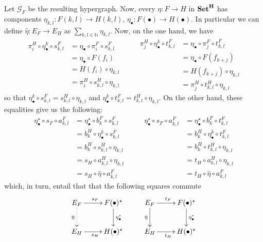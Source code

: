 \documentclass[runningheads,envcountsect]{llncs}
\newcommand{\catname}[1]{\textbf{\textup{#1}}}
\begin{document}
Let $\mathcal{G}_F$ be the resulting hypergraph. Now, every $\eta\colon F\rightarrow H$ in $\catname{Set}^{\catname{H}}$ has components $\eta_{k,l}\colon F(k,l)\to H(k,l)$, $\eta_{\bullet}\colon F(\bullet)\to H(\bullet)$. In particular we can define $\hat{\eta}\colon E_F\rightarrow E_H$ as $\sum_{k,l\in \mathbb{N}}\eta_{k,l}$. Now, on the one hand, we have
\[\begin{split}
	\pi^H_i\circ \eta^k_\bullet \circ  s^F_{k,l}&=\eta_\bullet \circ \pi^F_i \circ s^F_{k,l}\\&=\eta_\bullet \circ F(f_i)\\&=H(f_i)\circ \eta_{k,l}\\&=\pi^H_i\circ s^{H}_{k,l}\circ \eta_{k,l}
\end{split} \qquad \begin{split}
\pi^H_j\circ \eta^k_\bullet \circ  t^F_{k,l}&=\eta_\bullet \circ \pi^F_j \circ t^F_{k,l}\\&=\eta_\bullet \circ F(f_{k+j})\\&=H(f_{k+j})\circ \eta_{k,l}\\&=\pi^H_j\circ t^{H}_{k,l}\circ \eta_{k,l}
\end{split} \]
so that $\eta^k_\bullet \circ  s^F_{k,l}=s^{H}_{k,l}\circ \eta_{k,l}$ and $\eta^k_\bullet \circ  t^F_{k,l}= t^{H}_{k,l}\circ \eta_{k,l}$. On the other hand, these equalities give us the following:
\[\begin{split}
	\eta_{\bullet}^\star \circ s_{F}\circ a^F_{k,l}&=\eta_{\bullet}^\star \circ b^F_k\circ s^F_{k,l}\\&=b^H_k\circ \eta^k_{\bullet}\circ s^{F}_{k,l} \\&=b^H_{k}\circ s^H_{k,l}\circ \eta_{k,l}\\&=s_H\circ a^H_{k,l}\circ \eta_{k,l}\\&=	s_H\circ \hat{\eta}\circ a^F_{k,l}
\end{split} \qquad \begin{split}
	\eta_{\bullet}^\star \circ s_{F}\circ a^F_{k,l}&=\eta_{\bullet}^\star \circ b^F_k\circ t^F_{k,l}\\&=b^H_k\circ \eta^k_{\bullet}\circ t^{F}_{k,l} \\&=b^H_{k}\circ t^H_{k,l}\circ \eta_{k,l}\\&=t_H\circ a^H_{k,l}\circ \eta_{k,l}\\&=	t_H\circ \hat{\eta}\circ a^F_{k,l}
\end{split}\]
which, in turn, entail that  that the following squares commute
\[\xymatrix{E_F \ar[r]^{s_F} \ar@{.>}[d]_{\hat{\eta}}& F(\bullet)^\star \ar[d]^{\eta^\star_\bullet} & E_F \ar[r]^{t_F} \ar[d]_{\hat{\eta}} & F(\bullet)^\star \ar[d]^{\eta^\star_\bullet}\\ E_H \ar[r]_{s_H} & H(\bullet)^\star & E_H \ar[r]_{t_H}& H(\bullet)^\star}\]
\end{document}
